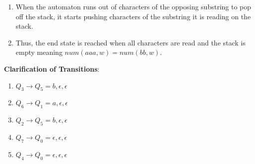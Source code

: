 \documentclass{article}
\begin{document}
\begin{enumerate}
\begin{enumerate}
					\item When the automaton runs out of characters of the opposing substring to pop off the stack, it starts pushing characters of the substring it is reading on the stack.
					\item Thus, the end state is reached when all characters are read and the stack is empty meaning $num(aaa,w) = num(bb,w)$.
				\end{enumerate}
			\textbf{Clarification of Transitions}:\begin{enumerate}
				\item $Q_3 \rightarrow Q_5 = b,\epsilon,\epsilon$
				\item $Q_6 \rightarrow Q_1 = a,\epsilon,\epsilon$
				\item $Q_2 \rightarrow Q_5 = b,\epsilon,\epsilon$
				\item $Q_7 \rightarrow Q_0 = \epsilon,\epsilon,\epsilon$
				\item $Q_4 \rightarrow Q_0 = \epsilon,\epsilon,\epsilon$
				\end{enumerate}

	\end{enumerate}
\end{document}
